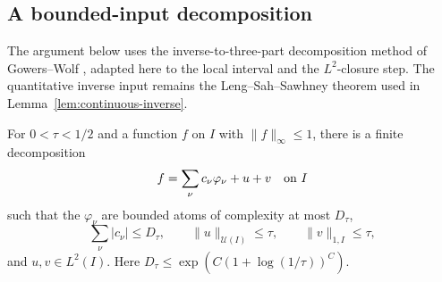 \subsection{A bounded-input decomposition}

The argument below uses the inverse-to-three-part decomposition method of
Gowers--Wolf \cite[Proposition~3.3 and Theorem~3.4]{GW2010}, adapted here to
the local interval and the \(L^2\)-closure step.  The quantitative inverse
input remains the Leng--Sah--Sawhney theorem \cite{LSS2024} used in
Lemma~\ref{lem:continuous-inverse}.

\begin{lemma}
\label{lem:bounded-decomposition}
For \(0<\tau<1/2\) and a function \(f\) on \(I\) with
\(\|f\|_\infty\le1\), there is a finite decomposition
\[
 f=\sum_\nu c_\nu\varphi_\nu+u+v
 \quad\hbox{on }I
\]
such that the \(\varphi_\nu\) are bounded atoms of complexity at most
\(D_\tau\),
\[
 \sum_\nu|c_\nu|\le D_\tau,\qquad
 \|u\|_{\mathcal U(I)}\le\tau,\qquad
 \|v\|_{1,I}\le\tau,
\]
and \(u,v\in L^2(I)\).  Here
\(D_\tau\le\exp(C(1+\log(1/\tau))^C)\).
\end{lemma}

